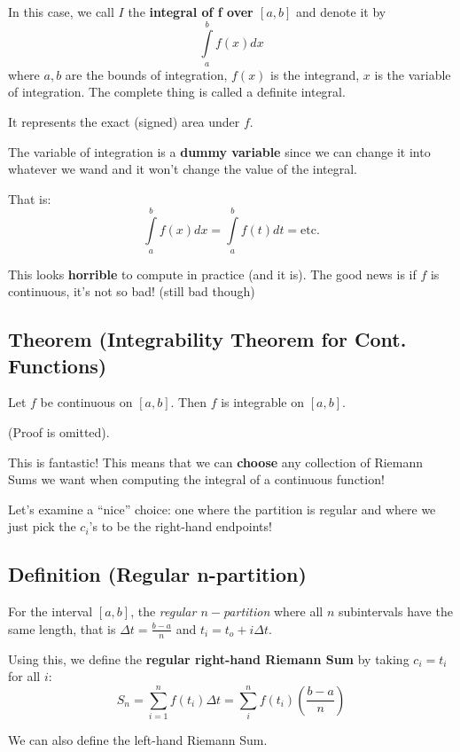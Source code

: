 In this case, we call $ I $ the \textbf{integral of f over $ [a,b] $ } and denote it by
\[ \int\limits_{a}^{b} f(x) dx \]
where $ a,b $ are the bounds of integration, $ f(x) $ is the integrand, $ x $ is the
variable of integration. The complete thing is called a definite integral.

It represents the exact (signed) area under $ f $.

\begin{remark}
    The variable of integration is a \textbf{dummy variable} since we can change it into
    whatever we wand and it won't change the value of the integral.

    That is:
    \[
        \int\limits_{a}^{b} f(x) dx =
        \int\limits_{a}^{b} f(t) d{t} = \text{etc.}
    \]
\end{remark}

This looks \textbf{horrible} to compute in practice (and it is). The good news is if
$ f $ is continuous, it's not so bad! (still bad though)

\subsection{Theorem (Integrability Theorem for Cont. Functions)}
Let $ f $ be continuous on $ [a,b] $. Then $ f $ is integrable on $ [a,b] $.

(Proof is omitted).

This is fantastic! This means that we can \textbf{choose} any collection of Riemann Sums
we want when computing the integral of a continuous function!

Let's examine a ``nice'' choice: one where the partition is regular and where we just
pick the $ c_i $'s to be the right-hand endpoints!

\subsection{Definition (Regular n-partition)}
For the interval $ [a,b] $, the \emph{regular $n-$partition} where all $ n $ subintervals
have the same length, that is $ \Delta t=\frac{b-a}{n} $ and $ t_i=t_o+i\Delta t $.

Using this, we define the \textbf{regular right-hand Riemann Sum} by taking $ c_i=t_i $ for
all $ i $:
\[ S_n=\sum\limits_{i=1}^{n} f(t_i)\Delta t=\sum\limits_{i}^{n} f(t_i)\left(\frac{b-a}{n}\right) \]

\begin{remark}
    We can also define the left-hand Riemann Sum.
\end{remark}

